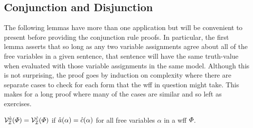 \subsection{Conjunction and Disjunction}%
  \label{sub:ConjunctionDisjunction}

The following lemmas have more than one application but will be convenient to present before providing the conjunction rule proofs.
In particular, the first lemma asserts that so long as any two variable assignments agree about all of the free variables in a given sentence, that sentence will have the same truth-value when evaluated with those variable assignments in the same model.
Although this is not surprising, the proof goes by induction on complexity where there are separate cases to check for each form that the wff in question might take.
This makes for a long proof where many of the cases are similar and so left as exercises.

\begin{Lthm} \label{lemma:assign}
  $\mathcal{V}_{\mathcal{I}}^{\hat{a}}(\varPhi)=\mathcal{V}_{\mathcal{I}}^{\hat{c}}(\varPhi)$ if $\hat{a}(\alpha)=\hat{c}(\alpha)$ for all free variables $\alpha$ in a wff $\varPhi$.
\end{Lthm}

